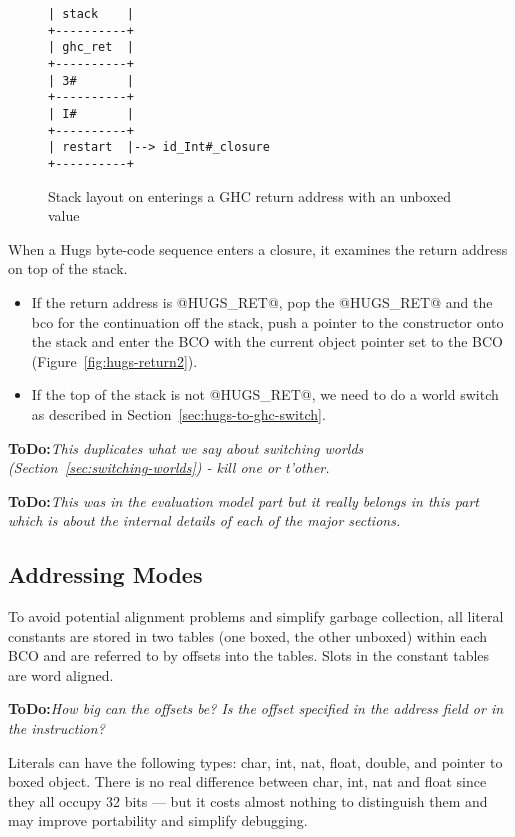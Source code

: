 \documentclass[11pt]{article}
\newcommand{\ToDo}[1]{{{\bf ToDo:}\sl #1}}
\newcommand{\secref}[1]{Section~\ref{sec:#1}}
\newcommand{\figref}[1]{Figure~\ref{fig:#1}}
\newcommand{\Subsection}[2]{\subsection{#1}\label{sec:#2}}
\begin{document}
\begin{figure}[ht]
\begin{center}
\begin{verbatim}
| stack    |
+----------+
| ghc_ret  |
+----------+
| 3#       |
+----------+
| I#       |
+----------+
| restart  |--> id_Int#_closure
+----------+
\end{verbatim}
%
\end{center}
\caption{Stack layout on enterings a GHC return address with an unboxed value}
\label{fig:hugs-return-int}
\end{figure}

When a Hugs byte-code sequence enters a closure, it examines the 
return address on top of the stack.

\begin{itemize}

\item If the return address is @HUGS_RET@, pop the @HUGS_RET@ and the
bco for the continuation off the stack, push a pointer to the constructor onto
the stack and enter the BCO with the current object pointer set to the BCO
(\figref{hugs-return2}).

\item If the top of the stack is not @HUGS_RET@, we need to do a world
switch as described in \secref{hugs-to-ghc-switch}.

\end{itemize}

\ToDo{This duplicates what we say about switching worlds
(\secref{switching-worlds}) - kill one or t'other.}


\ToDo{This was in the evaluation model part but it really belongs in
this part which is about the internal details of each of the major
sections.}

\Subsection{Addressing Modes}{hugs-addressing-modes}

To avoid potential alignment problems and simplify garbage collection,
all literal constants are stored in two tables (one boxed, the other
unboxed) within each BCO and are referred to by offsets into the tables.
Slots in the constant tables are word aligned.

\ToDo{How big can the offsets be?  Is the offset specified in the
address field or in the instruction?}

Literals can have the following types: char, int, nat, float, double,
and pointer to boxed object.  There is no real difference between
char, int, nat and float since they all occupy 32 bits --- but it
costs almost nothing to distinguish them and may improve portability
and simplify debugging.
\end{document}
